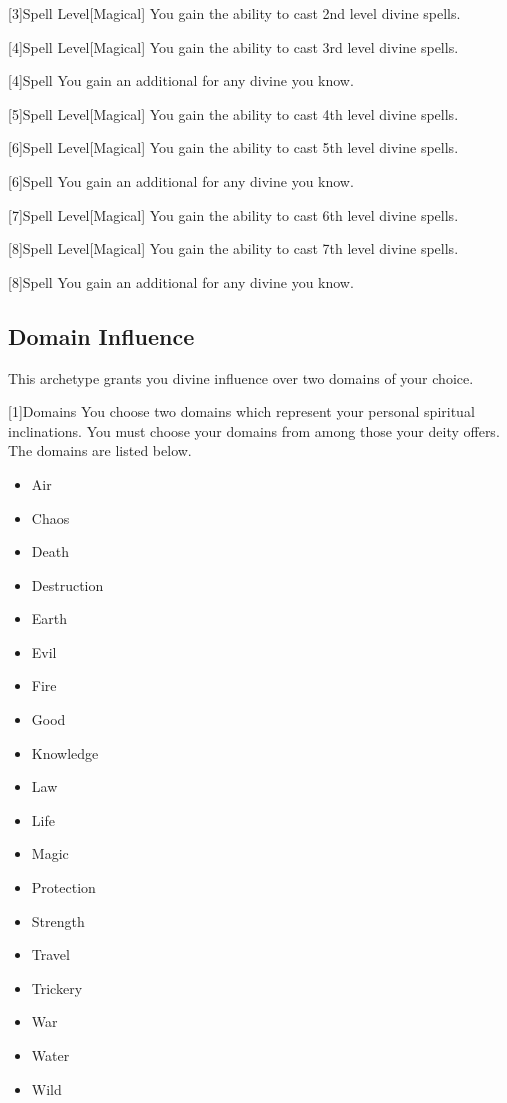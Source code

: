         [3]{Spell Level}[Magical] You gain the ability to cast 2nd level divine spells.

        [4]{Spell Level}[Magical] You gain the ability to cast 3rd level divine spells.

        [4]{Spell} You gain an additional  for any divine  you know.

        [5]{Spell Level}[Magical] You gain the ability to cast 4th level divine spells.

        [6]{Spell Level}[Magical] You gain the ability to cast 5th level divine spells.

        [6]{Spell} You gain an additional  for any divine  you know.

        [7]{Spell Level}[Magical] You gain the ability to cast 6th level divine spells.

        [8]{Spell Level}[Magical] You gain the ability to cast 7th level divine spells.

        [8]{Spell} You gain an additional  for any divine  you know.

    \subsection{Domain Influence}
        This archetype grants you divine influence over two domains of your choice.

        [1]{Domains}
        You choose two domains which represent your personal spiritual inclinations.
        You must choose your domains from among those your deity offers.
        The domains are listed below.

        \begin{itemize}
            \item{Air}
            \item{Chaos}
            \item{Death}
            \item{Destruction}
            \item{Earth}
            \item{Evil}
            \item{Fire}
            \item{Good}
            \item{Knowledge}
            \item{Law}
            \item{Life}
            \item{Magic}
            \item{Protection}
            \item{Strength}
            \item{Travel}
            \item{Trickery}
            \item{War}
            \item{Water}
            \item{Wild}
        \end{itemize}

